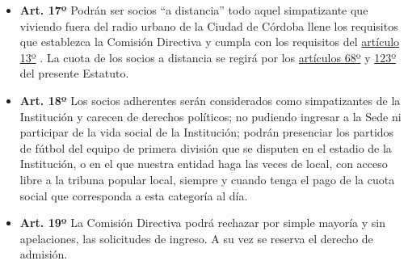 \documentclass[]{book}
\providecommand{\tightlist}{%
  \setlength{\itemsep}{0pt}\setlength{\parskip}{0pt}}
\begin{document}
\begin{itemize}
\tightlist
\item
  \textbf{Art. 17º} Podrán ser socios ``a distancia'' todo aquel
  simpatizante que viviendo fuera del radio urbano de la Ciudad de
  Córdoba llene los requisitos que establezca la Comisión Directiva y
  cumpla con los requisitos del \protect\hyperlink{art13}{artículo 13º}
  . La cuota de los socios a distancia se regirá por los
  \protect\hyperlink{art68}{artículos 68º} y
  \protect\hyperlink{art123}{123º} del presente Estatuto.
\end{itemize}

\begin{itemize}
\tightlist
\item
  \textbf{Art. 18º} Los socios adherentes serán considerados como
  simpatizantes de la Institución y carecen de derechos políticos; no
  pudiendo ingresar a la Sede ni participar de la vida social de la
  Institución; podrán presenciar los partidos de fútbol del equipo de
  primera división que se disputen en el estadio de la Institución, o en
  el que nuestra entidad haga las veces de local, con acceso libre a la
  tribuna popular local, siempre y cuando tenga el pago de la cuota
  social que corresponda a esta categoría al día.
\end{itemize}

\begin{itemize}
\tightlist
\item
  \textbf{Art. 19º} La Comisión Directiva podrá rechazar por simple
  mayoría y sin apelaciones, las solicitudes de ingreso. A su vez se
  reserva el derecho de admisión.
\end{itemize}
\end{document}
